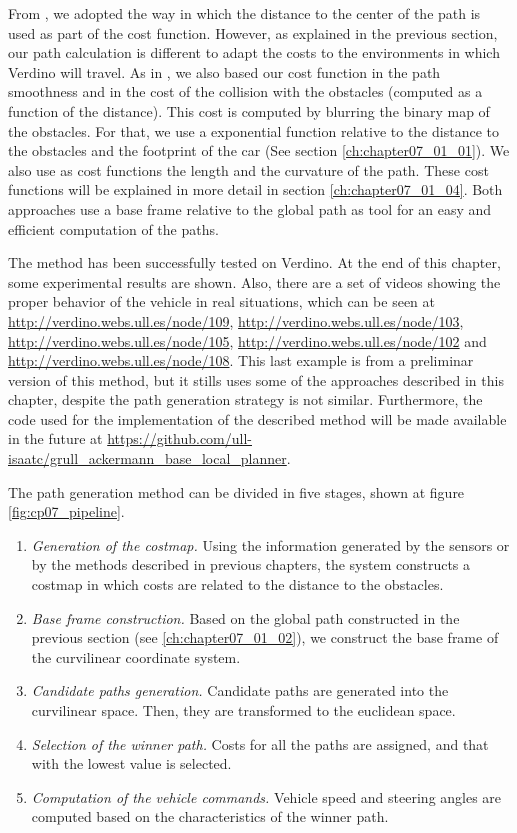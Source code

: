 From \cite{thrun2006stanley}, we adopted the way in which the distance to the center of the path is used as part of the cost function. However, as explained in the previous section, our path calculation is different to adapt the costs to the environments in which Verdino will travel. As in \cite{chu2012local}, we also based our cost function in the path smoothness and in the cost of the collision with the obstacles (computed as a function of the distance). This cost is computed by blurring the binary map of the obstacles. For that, we use a exponential function relative to the distance to the obstacles and the footprint of the car (See section \ref{ch:chapter07_01_01}).
We also use as cost functions the length and the curvature of the path. These cost functions will be explained in more detail in section \ref{ch:chapter07_01_04}. Both approaches \citep{chu2012local, thrun2006stanley} use a base frame relative to the global path as tool for an easy and efficient computation of the paths.

The method has been successfully tested on Verdino. At the end of this chapter, some experimental results are shown. Also, there are a set of videos showing the proper behavior of the vehicle in real situations, which can be seen at \url{http://verdino.webs.ull.es/node/109}, \url{http://verdino.webs.ull.es/node/103}, \url{http://verdino.webs.ull.es/node/105}, \url{http://verdino.webs.ull.es/node/102} and \url{http://verdino.webs.ull.es/node/108}. This last example is from a preliminar version of this method, but it stills uses some of the approaches described in this chapter, despite the path generation strategy is not similar.  Furthermore, the code used for the implementation of the described method will be made available in the future at \url{https://github.com/ull-isaatc/grull_ackermann_base_local_planner}. 

The path generation method can be divided in five stages, shown at figure \ref{fig:cp07_pipeline}.
\begin{enumerate}
 \item \emph{Generation of the costmap.} Using the information generated by the sensors or by the methods described in previous chapters, the system constructs a costmap in which costs are related to the distance to the obstacles.
 \item \emph{Base frame construction.} Based on the global path constructed in the previous section (see \ref{ch:chapter07_01_02}), we construct the base frame of the curvilinear coordinate system.
 \item \emph{Candidate paths generation.} Candidate paths are generated into the curvilinear space. Then, they are transformed to the euclidean space.
 \item \emph{Selection of the winner path.} Costs for all the paths are assigned, and that with the lowest value is selected.
 \item \emph{Computation of the vehicle commands.} Vehicle speed and steering angles are computed based on the characteristics of the winner path.
\end{enumerate}

